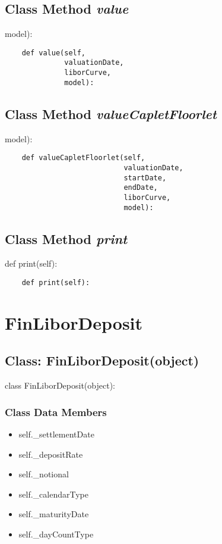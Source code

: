 \documentclass[twoside,11pt]{book}
\begin{document}
\subsection{Class Method {\it value}}
model):

\begin{lstlisting}
    def value(self,
              valuationDate,
              liborCurve,
              model):
\end{lstlisting}

\subsection{Class Method {\it valueCapletFloorlet}}
model):

\begin{lstlisting}
    def valueCapletFloorlet(self,
                            valuationDate,
                            startDate,
                            endDate,
                            liborCurve,
                            model):
\end{lstlisting}

\subsection{Class Method {\it print}}
def print(self):

\begin{lstlisting}
    def print(self):
\end{lstlisting}

\newpage
\section{FinLiborDeposit}

\subsection{Class: FinLiborDeposit(object)}
class FinLiborDeposit(object):

\subsubsection{Class Data Members}
\begin{itemize}
\item{self.\_settlementDate}
\item{self.\_depositRate}
\item{self.\_notional}
\item{self.\_calendarType}
\item{self.\_maturityDate}
\item{self.\_dayCountType}
\end{itemize}
\end{document}
